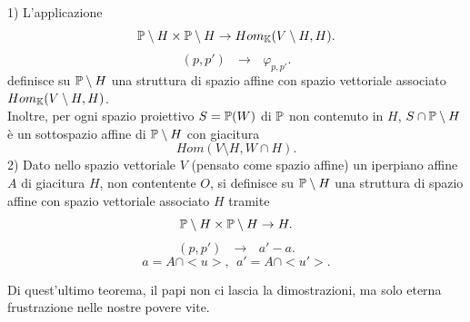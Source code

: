 \documentclass[12px]{article}
\begin{document}
 \begin{teo}
 	1) L'applicazione 
	\[
		\mathbb{P}\setminus H\times\mathbb{P}\setminus H \rightarrow Hom_{\mathbb{K}}(V\setminus H, H)
	.\] 
	\[
		(p,p') \ \ \ \rightarrow \ \ \ \varphi_{p,p'}
	.\] 
	definisce su $\mathbb{P}\setminus H$ una struttura di spazio affine con spazio vettoriale associato $Hom_{\mathbb{K}}(V\setminus H, H)$.\\
	Inoltre, per ogni spazio proiettivo $S = \mathbb{P}(W)$ di $\mathbb{P}$ non contenuto in  $H$, $S\cap \mathbb{P}\setminus H$ è un sottospazio affine di $\mathbb{P}\setminus H$ con giacitura
	\[
	Hom(V\setminus H, W\cap H)
	.\] 
	2) Dato nello spazio vettoriale $V$ (pensato come spazio affine) un iperpiano affine $A$ di giacitura $H$, non contentente $O$, si definisce su $\mathbb{P}\setminus H$ una struttura di spazio affine con spazio vettoriale associato $H$ tramite
	\[
	\mathbb{P}\setminus H\times\mathbb{P}\setminus H \rightarrow H
	.\] 
	\[
		(p,p') \ \ \ \rightarrow \ \ \ a'-a
	.\] 
	\[
	a = A\cap <u>, \ \ a' = A\cap <u'>
	.\] 
 \end{teo}
 Di quest'ultimo teorema, il papi non ci lascia la dimostrazioni, ma solo eterna frustrazione nelle nostre povere vite.
\end{document}
